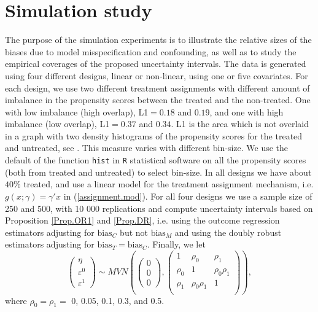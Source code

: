 \documentclass[11pt]{article}
\newcommand{\bias}{\mbox{bias}}
\begin{document}
\section{Simulation study}
\label{Sim.sec}
The purpose of the simulation experiments is to illustrate the relative sizes of the biases due to model misspecification and confounding, as well as to study the empirical coverages of the proposed uncertainty intervals. The data is generated using four different designs, linear or non-linear, using one or five covariates. For each design, we use two different treatment assignments with different amount of imbalance in the propensity scores between the treated and the non-treated. One with low imbalance (high overlap), L1$=0.18$ and $0.19$, and one with high imbalance (low overlap), L1$=0.37$ and $0.34$. L1 is the area which is not overlaid in a graph with two density histograms of the propensity scores for the treated and untreated, see \citet[equation (5)]{L1}. This measure varies with different bin-size. We use the default of the function {\tt hist} in {\tt R} statistical software on all the propensity scores (both from treated and untreated) to select bin-size. %
In all designs we have about $40\%$ treated, and use a linear model for the treatment assignment mechanism, i.e. $g(x; \gamma)= \gamma' x$ in (\ref{assignment.mod}). For all four designs we use a sample size of 250 and 500, with 10 000 replications and compute uncertainty intervals based on Proposition \ref{Prop.OR1} and \ref{Prop.DR}, i.e. using the outcome regression estimators adjusting for $\bias_C$ but not $\bias_M$ and using the doubly robust estimators adjusting for $\bias_T=\bias_C$. Finally, we let
$$\begin{pmatrix} \eta\\ \varepsilon^0 \\ \varepsilon^1  \end{pmatrix} \sim MVN\left(\begin{pmatrix}0\\0\\0  \end{pmatrix},\begin{pmatrix}
 1 & \rho_0& \rho_1 \\ 
 \rho_0& 1 & \rho_0 \rho_1 \\ 
 \rho_1 & \rho_0 \rho_1 & 1 \\ 
  \end{pmatrix}\right),$$ 
  where $\rho_0=\rho_1 =$ 0, 0.05, 0.1, 0.3, and 0.5. 
\end{document}
